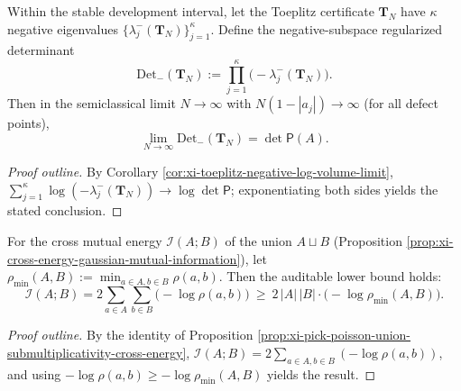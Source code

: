\begin{corollary}\label{cor:xi-toeplitz-negative-regularized-determinant-limit}
Within the stable development interval, let the Toeplitz certificate \(\mathbf{T}_N\) have \(\kappa\) negative eigenvalues \(\{\lambda_j^{-}(\mathbf{T}_N)\}_{j=1}^{\kappa}\).
Define the negative-subspace regularized determinant
\[
\mathrm{Det}_{-}(\mathbf{T}_N):=\prod_{j=1}^{\kappa}\bigl(-\lambda_j^{-}(\mathbf{T}_N)\bigr).
\]
Then in the semiclassical limit \(N\to\infty\) with \(N(1-|a_j|)\to\infty\) (for all defect points),
\[
\boxed{\;
\lim_{N\to\infty}\mathrm{Det}_{-}(\mathbf{T}_N)=\det\mathsf P(A).\;}
\]
\end{corollary}
\begin{proof}[Proof outline]
By Corollary \ref{cor:xi-toeplitz-negative-log-volume-limit},
\(\sum_{j=1}^{\kappa}\log(-\lambda_j^{-}(\mathbf{T}_N))\to \log\det\mathsf P\);
exponentiating both sides yields the stated conclusion. \qedhere
\end{proof}

\begin{corollary}\label{cor:xi-cross-energy-lower-bound-by-min-separation}
For the cross mutual energy \(\mathcal I(A;B)\) of the union \(A\sqcup B\) (Proposition \ref{prop:xi-cross-energy-gaussian-mutual-information}), let
\(
\rho_{\min}(A,B):=\min_{a\in A,b\in B}\rho(a,b)
\).
Then the auditable lower bound holds:
\[
\boxed{\;
\mathcal I(A;B)
=2\sum_{a\in A}\sum_{b\in B}\bigl(-\log\rho(a,b)\bigr)
\ \ge\
2\,|A|\,|B|\cdot\bigl(-\log\rho_{\min}(A,B)\bigr).\;}
\]
\end{corollary}
\begin{proof}[Proof outline]
By the identity of Proposition \ref{prop:xi-pick-poisson-union-submultiplicativity-cross-energy},
\(\mathcal I(A;B)=2\sum_{a\in A,b\in B}(-\log\rho(a,b))\), and using
\(-\log\rho(a,b)\ge -\log\rho_{\min}(A,B)\) yields the result. \qedhere
\end{proof}

